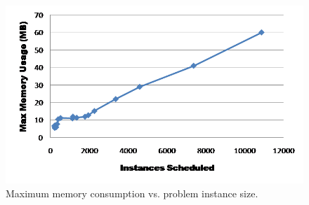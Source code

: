 \begin{figure}[ht]
		\label{fig:memusage}
		\includegraphics[scale=.7]{figures/memusage.png}
		\centering
		\caption{Maximum memory consumption vs. problem instance size.}
\end{figure}
